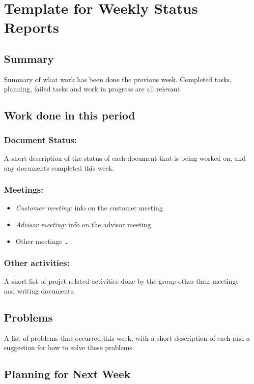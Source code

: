 \usepackage{listings}
\chapter{Template for Weekly Status Reports}
\section*{Summary}
Summary of what work has been done the previous week. Completed tasks, planning, failed tasks and work in progress are all relevant

\section*{Work done in this period}
\subsection*{Document Status:}
A short description of the status of each document that is being worked on, and any documents completed this week.

\subsection*{Meetings:}
\begin{itemize}
\item \emph{Customer meeting:} info on the customer meeting
\item \emph{Advisor meeting:} info on the advisor meeting
\item Other meetings \ldots
\end{itemize}

\subsection*{Other activities:} A short list of projet related activities done by the group other than meetings and writing documents.

\section*{Problems}
A list of problems that occurred this week, with a short description of each and a suggestion for how to solve these problems.

\section*{Planning for Next Week}
